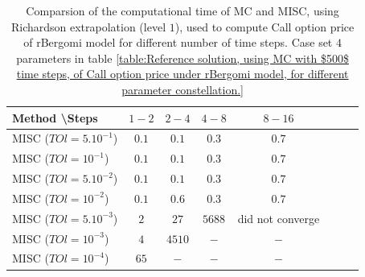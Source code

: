 \documentclass[11pt]{article}
\begin{document}
\begin{table}[h!]
\centering
\begin{tabular}{l*{6}{c}r}
Method \textbackslash  Steps            & $1-2$ & $2-4$ & $4-8$ & $8-16$ &   \\
\hline
MISC ($TOl=5.10^{-1}$)  & $0.1$ & $0.1$ & $0.3$ & $0.7$  \\
MISC ($TOl=10^{-1}$)  & $0.1$ & $0.1$ & $0.3$ & $0.7$   \\
MISC ($TOl=5.10^{-2}$)  &$0.1$ & $0.1$ & $0.3$ &$0.7$ \\
MISC ($TOl=10^{-2}$)  & $0.1$ & $0.6$ & $0.3$ & $0.7$   \\	
MISC ($TOl=5.10^{-3}$)  & $2$ & $27$ & $5688$ & did not converge \\
MISC ($TOl=10^{-3}$)  & $4$ & $4510$ & $-$ & $-$  \\
MISC ($TOl=10^{-4}$)  & $65$ & $-$ & $-$ & $-$   \\
\hline

\end{tabular}
\caption{Comparsion of the computational time of  MC and MISC, using Richardson extrapolation (level $1$), used to compute Call option price of rBergomi model for different number of time steps. Case set $4$ parameters in table \ref{table:Reference solution, using MC with $500$ time steps, of Call option price under rBergomi model, for different parameter constellation.}}
\label{Comparsion of the computational time of  MC and MISC, using Richardson extrapolation (level $1$), used to compute Call option price of rBergomi model for different number of time steps. Case set $4$ parameters,linear}
\end{table}




\FloatBarrier
\end{document}
